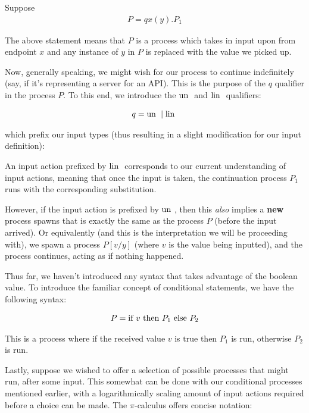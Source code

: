 Suppose
\begin{align*}
    P = q x(y).P_1
\end{align*}

The above statement means that $P$ is a process which takes in input upon from endpoint $x$ and any instance of $y$ in $P$ is replaced with the value we picked up.

Now, generally speaking, we might wish for our process to continue indefinitely (say, if it's representing a server for an API). This is the purpose of the $q$ qualifier in the process $P$. To this end, we introduce the $\text{un }$ and $\text{lin }$ qualifiers:

\begin{align*}
    q = \text{un } \mid \text{lin }
\end{align*}

which prefix our input types (thus resulting in a slight modification for our input definition):

An input action prefixed by $\text{lin }$ corresponds to our current understanding of input actions, meaning that once the input is taken, the continuation process $P_1$ runs with the corresponding substitution.

However, if the input action is prefixed by $\text{un }$, then this \textit{also} implies a \textbf{new} process spawns that is exactly the same as the process $P$ (before the input arrived). Or equivalently (and this is the interpretation we will be proceeding with), we spawn a process $P[v/y]$ (where $v$ is the value being inputted), and the process continues, acting as if nothing happened.

Thus far, we haven't introduced any syntax that takes advantage of the boolean value. To introduce the familiar concept of conditional statements, we have the following syntax:

\begin{align*}
    P = \text{if } v \text{ then } P_1 \text{ else } P_2
\end{align*}

This is a process where if the received value $v$ is $\text{true}$ then $P_1$ is run, otherwise $P_2$ is run.

Lastly, suppose we wished to offer a selection of possible processes that might run, after some input. This somewhat can be done with our conditional processes mentioned earlier, with a logarithmically scaling amount of input actions required before a choice can be made. The $\pi$-calculus offers concise notation:

